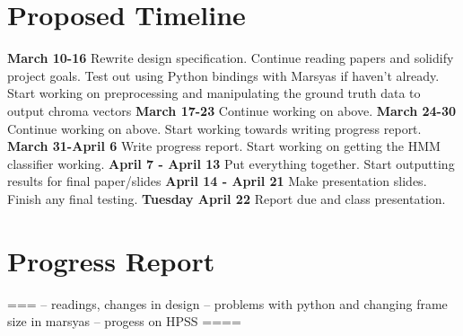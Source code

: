 \documentclass{article}
\begin{document}
\section{Proposed Timeline}\label{sec:timeline}

{\bf March 10-16}\newline
Rewrite design specification. Continue reading papers and solidify project
goals. Test out using Python bindings with Marsyas if haven't already. Start
working on preprocessing and manipulating the ground truth data to output
chroma vectors
\newline
{\bf March 17-23}\newline
Continue working on above.
\newline
{\bf March 24-30}\newline
Continue working on above. Start working towards writing progress report.
\newline
{\bf March 31-April 6}\newline
Write progress report. Start working on getting the HMM classifier working.
\newline
{\bf April 7 - April 13}\newline
Put everything together. Start outputting results for final paper/slides
\newline
{\bf April 14 - April 21}\newline
Make presentation slides. Finish any final testing.
\newline
{\bf Tuesday April 22}\newline
Report due and class presentation.

\section{Progress Report}\label{sec:progreport}


===
-- readings, changes in design
-- problems with python and changing frame size in marsyas
-- progess on HPSS
====
\end{document}
